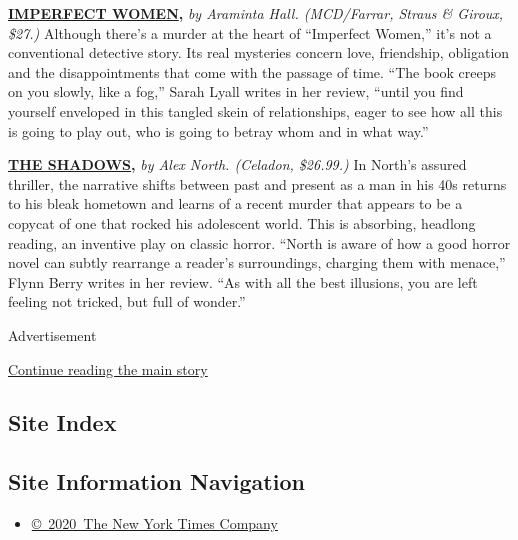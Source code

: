 \href{https://www.nytimes.com/2020/07/24/books/review/araminta-hall-imperfect-women.html}{\textbf{\textbf{IMPERFECT
WOMEN}}}\textbf{\textbf{,}} \emph{by Araminta Hall. (MCD/Farrar, Straus
\& Giroux, \$27.)} Although there's a murder at the heart of ``Imperfect
Women,'' it's not a conventional detective story. Its real mysteries
concern love, friendship, obligation and the disappointments that come
with the passage of time. ``The book creeps on you slowly, like a fog,''
Sarah Lyall writes in her review, ``until you find yourself enveloped in
this tangled skein of relationships, eager to see how all this is going
to play out, who is going to betray whom and in what way.''

\href{https://www.nytimes.com/2020/07/07/books/review/the-shadows-alex-north.html}{\textbf{\textbf{THE
SHADOWS}}}\textbf{\textbf{,}} \emph{by Alex North. (Celadon, \$26.99.)}
In North's assured thriller, the narrative shifts between past and
present as a man in his 40s returns to his bleak hometown and learns of
a recent murder that appears to be a copycat of one that rocked his
adolescent world. This is absorbing, headlong reading, an inventive play
on classic horror. ``North is aware of how a good horror novel can
subtly rearrange a reader's surroundings, charging them with menace,''
Flynn Berry writes in her review. ``As with all the best illusions, you
are left feeling not tricked, but full of wonder.''

Advertisement

\protect\hyperlink{after-bottom}{Continue reading the main story}

\hypertarget{site-index}{%
\subsection{Site Index}\label{site-index}}

\hypertarget{site-information-navigation}{%
\subsection{Site Information
Navigation}\label{site-information-navigation}}

\begin{itemize}
\tightlist
\item
  \href{https://help.nytimes.com/hc/en-us/articles/115014792127-Copyright-notice}{©~2020~The
  New York Times Company}
\end{itemize}

